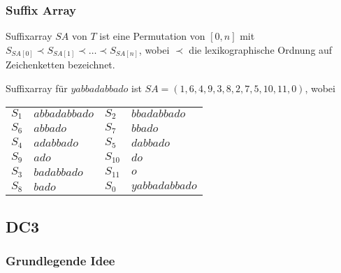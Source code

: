 \documentclass{beamer}
\begin{document}
\begin{frame}[fragile]
\frametitle{Suffix Array}
\begin{definition}
Suffixarray $SA$ von $T$ ist eine Permutation von $[0,n]$ mit $S_{SA[0]} \prec S_{SA[1]} \prec \dots \prec S_{SA[n]}$, wobei $\prec$ die lexikographische Ordnung auf Zeichenketten bezeichnet.
\end{definition}
\begin{example}
Suffixarray für $yabbadabbado$ ist $SA = (1, 6, 4, 9, 3, 8, 2, 7, 5, 10, 11, 0)$, wobei
\begin{table}
\begin{tabular}{l l|l l}
    \toprule
    $S_1$       & $a b b a d a b b a d o$ & $S_2$    & $b b a d a b b a d o$     \\
    $S_6$       & $a b b a d o$           & $S_7$    & $b b a d o$               \\
    $S_4$       & $a d a b b a d o$       & $S_5$    & $d a b b a d o$           \\
    $S_9$       & $a d o$                 & $S_{10}$ & $d o$                     \\
    $S_3$       & $b a d a b b a d o$     & $S_{11}$ & $o$                       \\
    $S_8$       & $b a d o$               & $S_0$    & $y a b b a d a b b a d o$ \\
    \bottomrule
\end{tabular}
\end{table}
\end{example}
\end{frame}

\subsection{DC3}

\begin{env}
\begin{frame}
\frametitle{Grundlegende Idee}
\begin{figure}
\begin{tikzpicture}

\end{tikzpicture}
\end{figure}
\end{frame}
\end{env}
\end{document}
